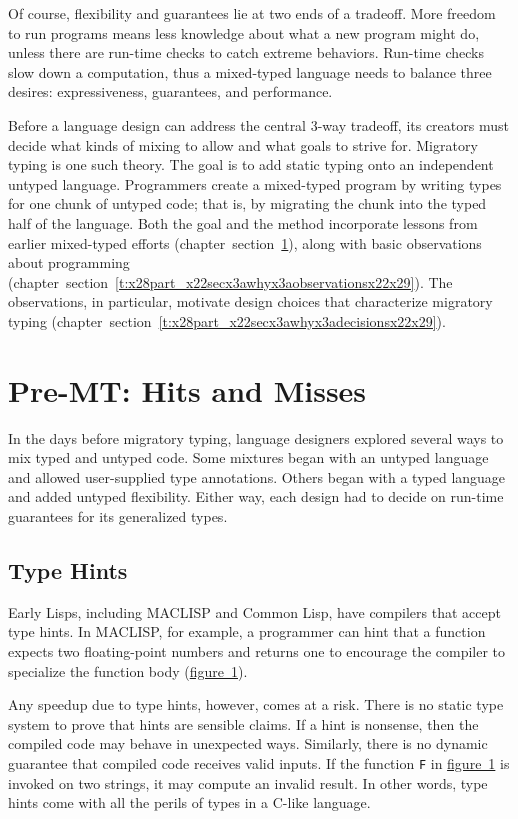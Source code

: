 \documentclass[ twoside,open=right,titlepage,numbers=noenddot,headinclude,%
                footinclude=true,cleardoublepage=empty,abstract=off,
                BCOR=5mm,paper=a4,fontsize=11pt,%
                ngerman,american,%
                parts,pdfspacing]{scrreprt}
\newcommand{\SecRef}[2]{section~#1}
\newcommand{\SecRefLocal}[3]{\hyperref[#1]{\SecRef{#2}{#3}}}
\newcommand{\Scribtexttt}[1]{{\texttt{#1}}}
\let\SOriginalthesubsubsection\thesubsubsection
\newcommand{\Ssubsection}[2]{\subsection[#1]{#2}\let\thesubsubsection\SOriginalthesubsubsection}
\newcommand{\Ssubsubsection}[2]{\subsubsection[#1]{#2}}
\newcommand{\FigureRef}[2]{#1}
\renewcommand{\Ssubsection}[2]{\section[#1]{#2}}
\renewcommand{\Ssubsubsection}[2]{\subsection[#1]{#2}}
\renewcommand{\SecRefLocal}[3]{section~\ref{#1}}
\begin{document}
Of course, flexibility and guarantees lie at two ends of a tradeoff.
More freedom to run programs means less knowledge about what a new
 program might do, unless there are run{-}time checks to catch extreme behaviors.
Run{-}time checks slow down a computation, thus a mixed{-}typed language needs to
 balance three desires: expressiveness, guarantees, and performance.

Before a language design can address the central 3{-}way tradeoff, its creators
 must decide what kinds of mixing to allow and what goals to strive for.
Migratory typing is one such theory.
The goal is to add static typing onto an independent untyped
 language.
Programmers create a mixed{-}typed program by writing types for
 one chunk of untyped code; that is, by migrating the chunk into the typed
 half of the language.
Both the goal and the method incorporate lessons from earlier mixed{-}typed efforts
 (chapter~\SecRefLocal{t:x28part_x22secx3awhyx3arelatedx22x29}{2.1}{Pre{-}MT: Hits and Misses}), along with basic
 observations about programming (chapter~\SecRefLocal{t:x28part_x22secx3awhyx3aobservationsx22x29}{2.2}{MT: Observations}).
The observations, in particular, motivate design choices that characterize
 migratory typing (chapter~\SecRefLocal{t:x28part_x22secx3awhyx3adecisionsx22x29}{2.3}{MT: Design Choices}).

\Ssubsection{Pre{-}MT: Hits and Misses}{Pre{-}MT: Hits and Misses}\label{t:x28part_x22secx3awhyx3arelatedx22x29}

In the days before migratory typing, language designers explored several ways
 to mix typed and untyped code.
Some mixtures began with an untyped language and allowed
 user{-}supplied type annotations.
Others began with a typed language and added untyped flexibility.
Either way, each design had to decide on run{-}time guarantees for its
 generalized types.

\Ssubsubsection{Type Hints}{Type Hints}\label{t:x28part_x22Typex5fHintsx22x29}

Early Lisps, including MACLISP and Common Lisp,
 have compilers that accept type hints.
In MACLISP, for example, a programmer can hint that a function expects two
 floating{-}point numbers and returns one to encourage the compiler to specialize
 the function body (\hyperref[t:x28counter_x28x22figurex22_x22figx3amaclispx2dhintx22x29x29]{figure~\FigureRef{1}{t:x28counter_x28x22figurex22_x22figx3amaclispx2dhintx22x29x29}}).

Any speedup due to type hints, however, comes at a risk.
There is no static type system to prove that hints are sensible claims.
If a hint is nonsense, then the compiled code may behave in unexpected ways.
Similarly, there is no dynamic guarantee that compiled code receives valid
 inputs.
If the function \Scribtexttt{F} in \hyperref[t:x28counter_x28x22figurex22_x22figx3amaclispx2dhintx22x29x29]{figure~\FigureRef{1}{t:x28counter_x28x22figurex22_x22figx3amaclispx2dhintx22x29x29}} is invoked on two
 strings, it may compute an invalid result.
In other words, type hints come with all the perils of types in a C{-}like language.
\end{document}
